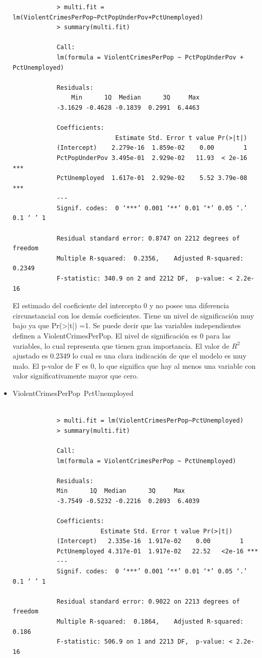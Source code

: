 \documentclass[a4paper,10pt,twocolumn]{article}
\begin{document}
\begin{itemize}
		\begin{verbatim}
			> multi.fit = lm(ViolentCrimesPerPop~PctPopUnderPov+PctUnemployed)
			> summary(multi.fit)

			Call:
			lm(formula = ViolentCrimesPerPop ~ PctPopUnderPov + PctUnemployed)

			Residuals:
				Min      1Q  Median      3Q     Max 
			-3.1629 -0.4628 -0.1839  0.2991  6.4463 

			Coefficients:
							Estimate Std. Error t value Pr(>|t|)    
			(Intercept)    2.279e-16  1.859e-02    0.00        1    
			PctPopUnderPov 3.495e-01  2.929e-02   11.93  < 2e-16 ***
			PctUnemployed  1.617e-01  2.929e-02    5.52 3.79e-08 ***
			---
			Signif. codes:  0 ‘***’ 0.001 ‘**’ 0.01 ‘*’ 0.05 ‘.’ 0.1 ‘ ’ 1

			Residual standard error: 0.8747 on 2212 degrees of freedom
			Multiple R-squared:  0.2356,	Adjusted R-squared:  0.2349 
			F-statistic: 340.9 on 2 and 2212 DF,  p-value: < 2.2e-16
		\end{verbatim}

	El estimado del coeficiente del intercepto 0 y no posee una diferencia circunstancial con los demás coeficientes. Tiene un nivel de significación muy bajo ya que Pr(>|t|) =1.
	Se puede decir que las variables independientes definen a ViolentCrimesPerPop. El nivel de significación es 0 para las variables, lo cual representa que tienen gran importancia. El valor de $R^2$ ajustado es 0.2349 lo cual es una clara indicación de que el modelo es muy malo. El p-valor de F es 0, lo que significa que hay al menos una variable con valor significativamente mayor que cero.

	\item{ViolentCrimesPerPop~PctUnemployed}
		\begin{verbatim}
			
			> multi.fit = lm(ViolentCrimesPerPop~PctUnemployed)
			> summary(multi.fit)
			
			Call:
			lm(formula = ViolentCrimesPerPop ~ PctUnemployed)
			
			Residuals:
			Min      1Q  Median      3Q     Max 
			-3.7549 -0.5232 -0.2216  0.2893  6.4039 
			
			Coefficients:
						Estimate Std. Error t value Pr(>|t|)    
			(Intercept)   2.335e-16  1.917e-02    0.00        1    
			PctUnemployed 4.317e-01  1.917e-02   22.52   <2e-16 ***
			---
			Signif. codes:  0 ‘***’ 0.001 ‘**’ 0.01 ‘*’ 0.05 ‘.’ 0.1 ‘ ’ 1
			
			Residual standard error: 0.9022 on 2213 degrees of freedom
			Multiple R-squared:  0.1864,	Adjusted R-squared:  0.186 
			F-statistic: 506.9 on 1 and 2213 DF,  p-value: < 2.2e-16
		\end{verbatim}


\end{itemize}
\end{document}
